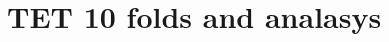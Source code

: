 \section{TET 10 folds and analasys}
	
	\begin{figure}[H]
		\centering
		\begin{adjustbox}{width=0.5\textwidth}
			
		\end{adjustbox}
		\caption{}
		\label{fig:tet errors}
	\end{figure}